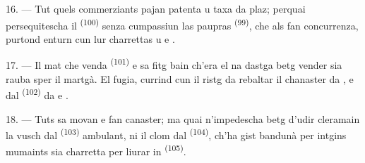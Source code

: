 16. --- Tut quels commerziants pajan patenta u taxa da plaz; perquai persequitescha
il  \textsuperscript{(100)} senza cumpassiun las paupras  \textsuperscript{(99)}, che als fan concurrenza, purtond enturn cun lur charrettas
 u  e .

\VUsaut{4.0mm}
\VUsaut{3.0mm}

17. --- Il mat che venda  \textsuperscript{(101)} e  sa fitg bain
ch'era el na dastga betg vender sia rauba sper il martgà. El fugia, currind cun il
ristg da rebaltar il chanaster da ,  e
 dal  \textsuperscript{(102)} da  e
.

18. --- Tuts sa movan e fan canaster; ma quai n'impedescha betg d'udir cleramain la
vusch dal  \textsuperscript{(103)} ambulant, ni il clom dal 
\textsuperscript{(104)}, ch'ha gist bandunà per intgins mumaints sia charretta per liurar
in  \textsuperscript{(105)}.

\VUsaut{6.0mm}
\VUfilet{22mm}
